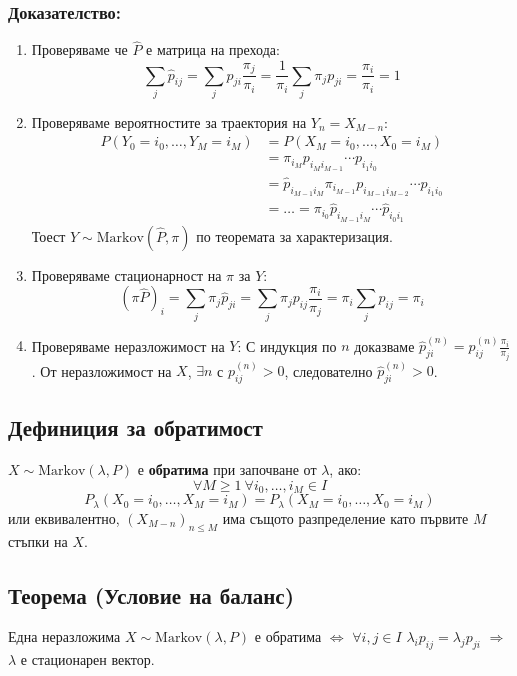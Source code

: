 \documentclass{article}
\begin{document}
\subsubsection*{Доказателство:}
\begin{enumerate}
\item Проверяваме че $\hat{P}$ е матрица на прехода:
$$\sum_j \hat{p}_{ij} = \sum_j p_{ji}\frac{\pi_j}{\pi_i} = \frac{1}{\pi_i}\sum_j \pi_j p_{ji} = \frac{\pi_i}{\pi_i} = 1$$

\item Проверяваме вероятностите за траектория на $Y_n = X_{M-n}$:
\begin{align*}
P(Y_0=i_0, \dots, Y_M=i_M) &= P(X_M=i_0, \dots, X_0=i_M) \\
&= \pi_{i_M} p_{i_M i_{M-1}} \cdots p_{i_1 i_0} \\
&= \hat{p}_{i_{M-1} i_M} \pi_{i_{M-1}} p_{i_{M-1} i_{M-2}} \cdots p_{i_1 i_0} \\
&= \dots = \pi_{i_0} \hat{p}_{i_{M-1} i_M} \cdots \hat{p}_{i_0 i_1}
\end{align*}
Тоест $Y \sim \text{Markov}(\hat{P}, \pi)$ по теоремата за характеризация.

\item Проверяваме стационарност на $\pi$ за $Y$:
$$(\pi \hat{P})_i = \sum_j \pi_j \hat{p}_{ji} = \sum_j \pi_j p_{ij} \frac{\pi_i}{\pi_j} = \pi_i \sum_j p_{ij} = \pi_i$$

\item Проверяваме неразложимост на $Y$:
С индукция по $n$ доказваме $\hat{p}_{ji}^{(n)} = p_{ij}^{(n)} \frac{\pi_i}{\pi_j}$. От неразложимост на $X$, $\exists n$ с $p_{ij}^{(n)} > 0$, следователно $\hat{p}_{ji}^{(n)} > 0$.
\end{enumerate}

\subsection{Дефиниция за обратимост}
$X \sim \text{Markov}(\lambda,P)$ е \textbf{обратима} при започване от $\lambda$, ако:
$$\forall M \geq 1\ \forall i_0,\dots,i_M \in I$$
$$P_\lambda(X_0=i_0, \dots, X_M=i_M) = P_\lambda(X_M=i_0, \dots, X_0=i_M)$$
или еквивалентно, $(X_{M-n})_{n \leq M}$ има същото разпределение като първите $M$ стъпки на $X$.

\subsection{Теорема (Условие на баланс)}
Една неразложима $X \sim \text{Markov}(\lambda,P)$ е обратима $\Leftrightarrow$ $\forall i,j \in I$ $\lambda_i p_{ij} = \lambda_j p_{ji}$ $\Rightarrow$ $\lambda$ е стационарен вектор.
\end{document}
